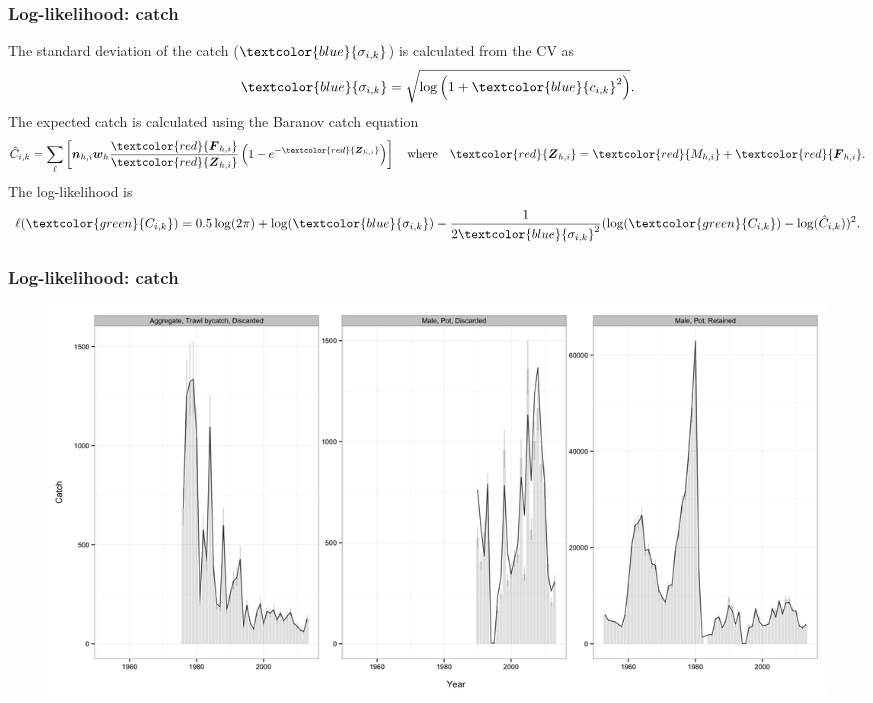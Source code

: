 \documentclass{beamer}
\begin{document}
\begin{frame}
\frametitle{Log-likelihood: catch}
The standard deviation of the catch ($\textcolor{blue}{\sigma_{i,k}}$) is calculated
from the CV as
\begin{equation*}
  \textcolor{blue}{\sigma_{i,k}} = \sqrt{\log \left( 1+\textcolor{blue}{c_{i,k}}^2 \right)}.
\end{equation*}
The expected catch is calculated using the Baranov catch equation
\begin{equation*}
  \hat{C}_{i,k} = \sum_{\ell} \left[ \boldsymbol{n}_{h,i} \boldsymbol{w}_{h}
    \frac{\textcolor{red}{\boldsymbol{F}_{h,i}}}{\textcolor{red}{\boldsymbol{Z}_{h,i}}} 
    \left( 1 - e^{-\textcolor{red}{\boldsymbol{Z}_{h,i}}} \right) \right] \quad \text{where}
  \quad \textcolor{red}{\boldsymbol{Z}_{h,i}}
  = \textcolor{red}{M_{h,i}} + \textcolor{red}{\boldsymbol{F}_{h,i}}.
\end{equation*}
The log-likelihood is
\begin{equation*}
  \ell(\textcolor{green}{C_{i,k}}) = 0.5 \log (2 \pi) + \log
  (\textcolor{blue}{\sigma_{i,k}}) -
  \frac{1}{2\textcolor{blue}{\sigma_{i,k}}^2} (\log (\textcolor{green}{C_{i,k}})
  - \log (\hat{C}_{i,k}))^2.
\end{equation*}
\end{frame}


\begin{frame}
\frametitle{Log-likelihood: catch}
\begin{figure}[!htbp]
  \centering
  \includegraphics[width=\linewidth]{../../examples/bbrkc/OneSex/figure/catch.png}
\end{figure}
\end{frame}

\end{document}

